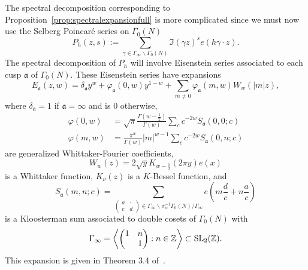 The spectral decomposition corresponding to Proposition~\ref{prop:spectralexpansionfull}
is more complicated since we must now use the Selberg Poincar\'{e} series on $\Gamma_0(N)$
\begin{equation}
  P_h(z,s) := \sum_{\gamma \in \Gamma_\infty \backslash \Gamma_0(N)} \Im(\gamma z)^s
  e(h\gamma \cdot z).
\end{equation}
The spectral decomposition of $P_h$ will involve Eisenstein series associated to each cusp
$\mathfrak{a}$ of $\Gamma_0(N)$.
These Eisenstein series have expansions
\begin{equation}
  E_\mathfrak{a} (z,w) = \delta_\mathfrak{a} y^w + \varphi_\mathfrak{a}(0,w) y^{1-w} +
  \sum_{m \neq 0} \varphi_\mathfrak{a} (m,w) W_w(\lvert m\rvert z),
\end{equation}
where $\delta_\mathfrak{a} = 1$ if $\mathfrak{a} = \infty$ and is $0$ otherwise,
\begin{align}
  \varphi(0, w) &= \sqrt \pi \frac{\Gamma(w - \frac{1}{2})}{\Gamma(w)} \sum_c
  c^{-2w}S_\mathfrak{a}(0,0;c) \\
  \varphi(m, w) &= \frac{\pi^w}{\Gamma(w)} \lvert m \rvert^{w-1} \sum_c c^{-2w}
  S_\mathfrak{a}(0, n; c)
\end{align}
are generalized Whittaker-Fourier coefficients,
\begin{equation}
  W_w(z) = 2\sqrt y K_{w - \frac{1}{2}}(2\pi y) e(x)
\end{equation}
is a Whittaker function, $K_\nu(z)$ is a $K$-Bessel function, and
\begin{equation}
  S_\mathfrak{a}(m,n; c) = \sum_{\left(\begin{smallmatrix} a&\cdot \\ c&d
  \end{smallmatrix}\right) \in \Gamma_\infty \backslash \sigma_\alpha^{-1} \Gamma_0(N) /
  \Gamma_\infty} e\left( m \frac{d}{c} + n \frac{a}{c}\right)
\end{equation}
is a Kloosterman sum associated to double cosets of $\Gamma_0(N)$ with
\begin{equation}
  \Gamma_\infty = \left \langle \begin{pmatrix} 1&n \\ &1 \end{pmatrix} : n \in \mathbb{Z}
\right\rangle \subset \operatorname{SL}_2(\mathbb{Z}).
\end{equation}
This expansion is given in Theorem 3.4 of~\cite{iwaniec2002spectral}.



